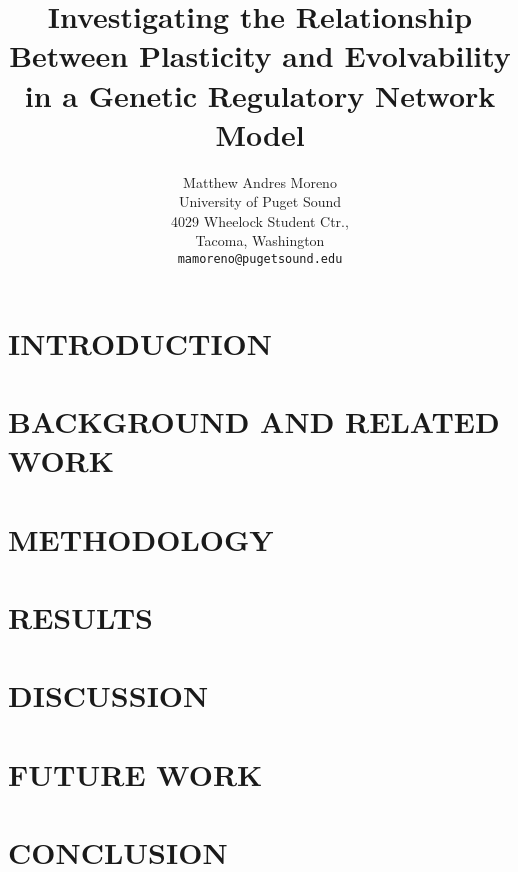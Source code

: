 \documentclass[letterpaper, 10 pt, conference]{ieeeconf}  %
\title{\LARGE \bf
Investigating the Relationship Between Plasticity and Evolvability in a Genetic Regulatory Network Model
}
\author{ \parbox{3 in}{\centering Matthew Andres Moreno
        \\
        University of Puget Sound\\
        4029 Wheelock Student Ctr., \\
        Tacoma, Washington\\
        {\tt\small mamoreno@pugetsound.edu}}
}
\begin{document}
\maketitle
\thispagestyle{empty}
\pagestyle{empty}


\begin{abstract}



\end{abstract}


\section{INTRODUCTION}



\section{BACKGROUND AND RELATED WORK}



\section{METHODOLOGY}



\section{RESULTS}



\section{DISCUSSION}



\section{FUTURE WORK}



\section{CONCLUSION}
\end{document}
